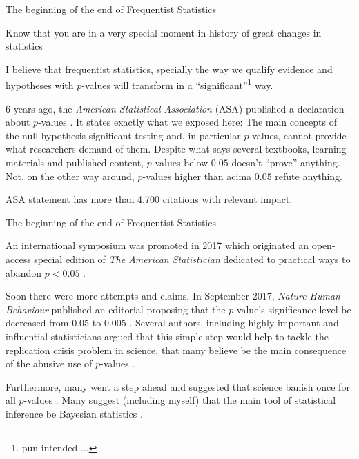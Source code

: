 \begin{frame}{The beginning of the end of Frequentist Statistics}
	\begin{vfilleditems}
		\small
		\item Know that you are in a very special moment in history of great changes in statistics
		\item I believe that frequentist statistics, specially the way we qualify evidence and hypotheses with
		$p$-values will transform in a ``significant''\footnote{pun intended ...} way.
		\item 6 years ago, the \textit{American Statistical Association} (ASA) published a declaration about
		$p$-values \parencite{Wasserstein2016}.
		It states exactly what we exposed here:
		The main concepts of the null hypothesis significant testing and,
		in particular $p$-values, cannot provide what researchers demand of them.
		Despite what says several textbooks, learning materials and published content,
		$p$-values below $0.05$ doesn't ``prove'' anything.
		Not, on the other way around, $p$-values higher than acima $0.05$ refute anything.
		\item ASA statement has more than 4.700 citations with relevant impact.
	\end{vfilleditems}
\end{frame}

\begin{frame}{The beginning of the end of Frequentist Statistics}
	\begin{vfilleditems}
		\small
		\item An international symposium was promoted in 2017 which originated an open-access special edition of
		\textit{The American Statistician} dedicated to practical ways to abandon $p < 0.05$
		\parencite{wassersteinMovingWorld052019}.
		\item Soon there were more attempts and claims.
		In September 2017, \textit{Nature Human Behaviour} published an editorial proposing that the $p$-value's
		significance level be decreased from $0.05$ to $0.005$ \parencite{benjaminRedefineStatisticalSignificance2018}.
		Several authors, including highly important and influential statisticians argued that this simple step would
		help to tackle the replication crisis problem in science, that many believe be the main consequence
		of the abusive use of $p$-values \parencite{Ioannidis2019}.
		\item Furthermore, many went a step ahead and suggested that science banish once for all $p$-values
		\parencite{ItTimeTalk2019,lakensJustifyYourAlpha2018}.
		Many suggest (including myself) that the main tool of statistical inference
		be Bayesian statistics \parencite{amrheinScientistsRiseStatistical2019, Goodman1180, vandeschootBayesianStatisticsModelling2021}.
	\end{vfilleditems}
\end{frame}
